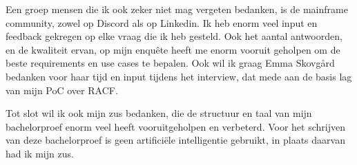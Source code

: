 Een groep mensen die ik ook zeker niet mag vergeten bedanken, is de mainframe community, zowel op Discord als op Linkedin. Ik heb enorm veel input en feedback gekregen op elke vraag die ik heb gesteld. Ook het aantal antwoorden, en de kwaliteit ervan, op mijn enquête heeft me enorm vooruit geholpen om de beste requirements en use cases te bepalen. Ook wil ik graag Emma Skovgård bedanken voor haar tijd en input tijdens het interview, dat mede aan de basis lag van mijn PoC over RACF.

Tot slot wil ik ook mijn zus bedanken, die de structuur en taal van mijn bachelorproef enorm veel heeft vooruitgeholpen en verbeterd. Voor het schrijven van deze bachelorproef is geen artificiële intelligentie gebruikt, in plaats daarvan had ik mijn zus.